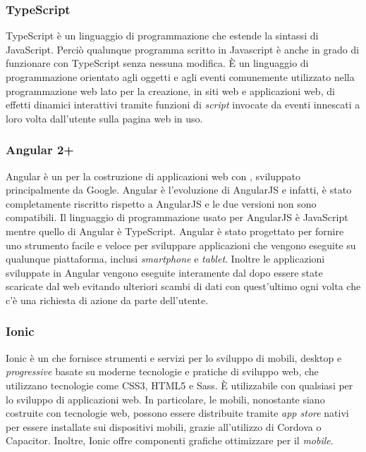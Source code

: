\subsubsection*{TypeScript}
TypeScript è un linguaggio di programmazione  che estende la sintassi di JavaScript. Perciò qualunque programma scritto in Javascript è anche in grado di funzionare con TypeScript senza nessuna modifica. È un linguaggio di programmazione orientato agli oggetti e agli eventi comunemente utilizzato nella programmazione web lato  per la creazione, in siti web e applicazioni web, di effetti dinamici interattivi tramite funzioni di \emph{script} invocate da eventi innescati a loro volta dall'utente sulla pagina web in uso.

\subsubsection*{Angular 2+}
Angular è un   per la costruzione di applicazioni web con , sviluppato principalmente da Google. Angular è l'evoluzione di AngularJS e infatti, è stato completamente riscritto rispetto a AngularJS e le due versioni non sono compatibili. Il linguaggio di programmazione usato per AngularJS è JavaScript mentre quello di Angular è TypeScript. Angular è stato progettato per fornire uno strumento facile e veloce per sviluppare applicazioni che vengono eseguite su qualunque piattaforma, inclusi \emph{smartphone} e \emph{tablet}. Inoltre le applicazioni sviluppate in Angular vengono eseguite interamente dal  dopo essere state scaricate dal web  evitando ulteriori scambi di dati con quest'ultimo ogni volta che c'è una richiesta di azione da parte dell'utente. 

\subsubsection*{Ionic}
Ionic è un   che fornisce strumenti e servizi per lo sviluppo di \textcolor{SchoolColor}{\ap{[g]}} mobili, desktop e \emph{progressive} basate su moderne tecnologie e pratiche di sviluppo web, che utilizzano tecnologie come \gls{CSS}3, \gls{HTML}5 e \gls{Sass}. È utilizzabile con qualsiasi  per lo sviluppo di applicazioni web. In particolare, le \textcolor{SchoolColor}{\ap{[g]}} mobili, nonostante siano costruite con tecnologie web, possono essere distribuite tramite \emph{app store} nativi per essere installate sui dispositivi mobili, grazie all'utilizzo di  Cordova o Capacitor. Inoltre, Ionic offre componenti grafiche ottimizzare per il \emph{mobile}.

